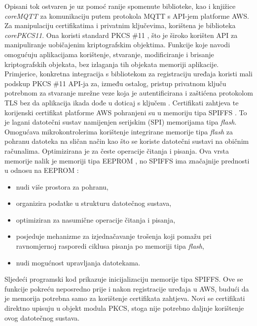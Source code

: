 Opisani tok ostvaren je uz pomoć ranije spomenute biblioteke, kao i knjižice \textit{coreMQTT} za komunikaciju putem protokola MQTT s API-jem platforme AWS. Za manipulaciju certifikatima i privatnim ključevima, korištena je biblioteka \textit{corePKCS11}. Ona koristi standard PKCS \#11 , što je široko korišten API za manipuliranje uobičajenim kriptografskim objektima. Funkcije koje navodi omogućuju aplikacijama korištenje, stvaranje, modificiranje i brisanje kriptografskih objekata, bez izlaganja tih objekata memoriji aplikacije. Primjerice, konkretna integracija s bibliotekom za registraciju uređaja koristi mali podskup PKCS \#11 API-ja za, između ostalog, pristup privatnom ključu potrebnom za stvaranje mrežne veze koja je autentificirana i zaštićena protokolom TLS bez da aplikacija ikada dođe u doticaj s ključem \cite{what_is_pkcs}. Certifikati zahtjeva te korijenski certifikat platforme AWS pohranjeni su u memoriju tipa SPIFFS . To je lagani datotečni sustav namijenjen serijskim (SPI) memorijama tipa \textit{flash}. Omogućava mikrokontrolerima korištenje integrirane memorije tipa \textit{flash} za pohranu datoteka na sličan način kao što se koriste datotečni sustavi na običnim računalima. Optimizirana je za česte operacije čitanja i pisanja. Ova vrsta memorije nalik je memoriji tipa EEPROM , no SPIFFS ima značajnije prednosti u odnosu na EEPROM \cite{spiffs}:
\begin{itemize}
	\item nudi više prostora za pohranu,
	\item organizira podatke u strukturu datotečnog sustava,
	\item optimiziran za nasumične operacije čitanja i pisanja, 
	\item posjeduje mehanizme za izjednačavanje trošenja koji pomažu pri ravnomjernoj rasporedi ciklusa pisanja po memoriji tipa \textit{flash},
	\item nudi mogućnost upravljanja datotekama.
\end{itemize}

Sljedeći programski kod prikazuje inicijalizaciju memorije tipa SPIFFS. Ove se funkcije pokreću neposredno prije i nakon registracije uređaja u AWS, budući da je memorija potrebna samo za korištenje certifikata zahtjeva. Novi se certifikati direktno upisuju u objekt modula PKCS, stoga nije potrebno daljnje korištenje ovog datotečnog sustava.

